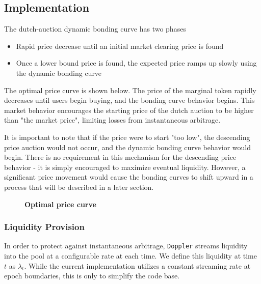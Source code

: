 \documentclass[sigconf,nonacm,prologue,table]{acmart}
\numberwithin{equation}{section}
\theoremstyle{definition}
\theoremstyle{remark}
\begin{document}
\subsection{Implementation}

The dutch-auction dynamic bonding curve has two phases
\begin{itemize}
    \item Rapid price decrease until an initial market clearing price is found
    \item Once a lower bound price is found, the expected price ramps up slowly using the dynamic bonding curve
\end{itemize}

 The optimal price curve is shown below. The price of the marginal token rapidly decreases until users begin buying, and the bonding curve behavior begins. This market behavior encourages the starting price of the dutch auction to be higher than "the market price", limiting losses from instantaneous arbitrage.
 
 It is important to note that if the price were to start "too low", the descending price auction would not occur, and the dynamic bonding curve behavior would begin. There is no requirement in this mechanism for the descending price behavior - it is simply encouraged to maximize eventual liquidity. However, a significant price movement would cause the bonding curves to shift upward in a process that will be described in a later section.

\begin{figure}[htb]
    \label{fig:price_curve}
    \centering
    \caption{\textbf{Optimal price curve}}
\end{figure}

\subsubsection{Liquidity Provision}

In order to protect against instantaneous arbitrage, \verb|Doppler| streams liquidity into the pool at a configurable rate at each time. We define this liquidity at time $t$ as $\lambda_t$. While the current implementation utilizes a constant streaming rate at epoch boundaries, this is only to simplify the code base. 
\end{document}
